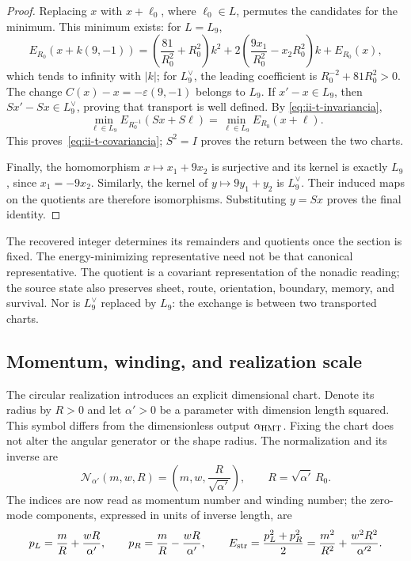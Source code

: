\begin{proof}
Replacing \(x\) with \(x+\ell_0\), where \(\ell_0\in L\),
permutes the candidates for the minimum. This minimum exists: for \(L=L_9\),
\[
 E_{R_0}(x+k(9,-1))
 =\left(\frac{81}{R_0^2}+R_0^2\right)k^2
  +2\left(\frac{9x_1}{R_0^2}-x_2R_0^2\right)k+E_{R_0}(x),
\]
which tends to infinity with \(|k|\); for \(L_9^\vee\), the
leading coefficient is \(R_0^{-2}+81R_0^2>0\). The change
\(C(x)-x=-\varepsilon(9,-1)\) belongs to \(L_9\).
If \(x'-x\in L_9\), then \(Sx'-Sx\in L_9^\vee\),
proving that transport is well defined. By
\eqref{eq:ii-t-invariancia},
\[
 \min_{\ell\in L_9}E_{R_0^{-1}}(Sx+S\ell)
 =\min_{\ell\in L_9}E_{R_0}(x+\ell).
\]
This proves~\eqref{eq:ii-t-covariancia}; \(S^2=I\) proves
the return between the two charts.

Finally, the homomorphism \(x\mapsto x_1+9x_2\) is
surjective and its kernel is exactly \(L_9\), since
\(x_1=-9x_2\). Similarly, the kernel of
\(y\mapsto9y_1+y_2\) is \(L_9^\vee\). Their induced maps
on the quotients are therefore isomorphisms. Substituting
\(y=Sx\) proves the final identity.
\end{proof}

The recovered integer determines its remainders and quotients once the
section is fixed. The energy-minimizing representative need not be that
canonical representative. The quotient is a covariant representation of the
nonadic reading; the source state also preserves sheet, route, orientation,
boundary, memory, and survival. Nor is \(L_9^\vee\) replaced
by \(L_9\): the exchange is between two transported charts.

\subsection{Momentum, winding, and realization scale}

The circular realization introduces an explicit dimensional chart.
Denote its radius by \(R>0\) and let \(\alpha'>0\) be a parameter
with dimension length squared. This symbol differs from the dimensionless
output \(\alpha_{\rm HMT}\). Fixing the chart does not alter the
angular generator or the shape radius. The normalization and its inverse are
\[
 \mathcal N_{\alpha'}(m,w,R)
 =\left(m,w,\frac{R}{\sqrt{\alpha'}}\right),\qquad
 R=\sqrt{\alpha'}\,R_0.
\]
The indices are now read as momentum number and winding
number; the zero-mode components, expressed in units of
inverse length, are
\begin{equation}
 p_L=\frac mR+\frac{wR}{\alpha'},\qquad
 p_R=\frac mR-\frac{wR}{\alpha'},\qquad
 E_{\rm str}=\frac{p_L^2+p_R^2}{2}
 =\frac{m^2}{R^2}+\frac{w^2R^2}{\alpha'^2}.
 \label{eq:ii-t-quirales}
\end{equation}

